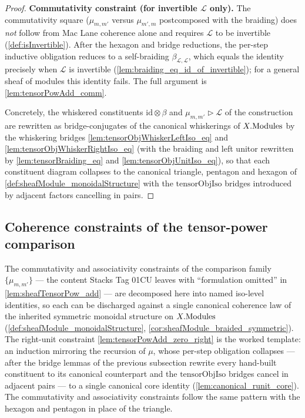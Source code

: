 \begin{proof}
  \textbf{Commutativity constraint (for invertible \(\mathcal{L}\) only).} The
  commutativity square (\(\mu_{m,m'}\) versus \(\mu_{m',m}\) postcomposed with the
  braiding) does \emph{not} follow from Mac Lane coherence alone and requires
  \(\mathcal{L}\) to be invertible (\cref{def:isInvertible}). After the hexagon and
  bridge reductions, the per-step inductive obligation reduces to a self-braiding
  \(\beta_{\mathcal{L},\mathcal{L}}\), which equals the identity precisely when
  \(\mathcal{L}\) is invertible (\cref{lem:braiding_eq_id_of_invertible}); for a
  general sheaf of modules this identity fails. The full argument is
  \cref{lem:tensorPowAdd_comm}.

  Concretely, the whiskered constituents \(\mathrm{id} \otimes \beta\) and
  \(\mu_{m,m'} \rhd \mathcal{L}\) of the construction are rewritten as
  bridge-conjugates of the canonical whiskerings of \(X.\mathrm{Modules}\) by the
  whiskering bridges \cref{lem:tensorObjWhiskerLeftIso_eq} and
  \cref{lem:tensorObjWhiskerRightIso_eq} (with the braiding and left unitor
  rewritten by \cref{lem:tensorBraiding_eq} and \cref{lem:tensorObjUnitIso_eq}), so
  that each constituent diagram collapses to the canonical triangle, pentagon and
  hexagon of \cref{def:sheafModule_monoidalStructure} with the
  \(\mathrm{tensorObjIso}\) bridges introduced by adjacent factors cancelling in
  pairs.
\end{proof}

\subsection{Coherence constraints of the tensor-power comparison}
\label{subsec:sgr_tensorPowAdd_constraints}

The commutativity and associativity constraints of the comparison family
\(\{\mu_{m,m'}\}\) --- the content Stacks Tag 01CU leaves with ``formulation
omitted'' in \cref{lem:sheafTensorPow_add} --- are decomposed here into named
iso-level identities, so each can be discharged against a single canonical
coherence law of the inherited symmetric monoidal structure on \(X.\mathrm{Modules}\)
(\cref{def:sheafModule_monoidalStructure},
\cref{cor:sheafModule_braided_symmetric}). The right-unit constraint
\cref{lem:tensorPowAdd_zero_right} is the worked template: an induction mirroring
the recursion of \(\mu\), whose per-step obligation collapses --- after the bridge
lemmas of the previous subsection rewrite every hand-built constituent to its
canonical counterpart and the \(\mathrm{tensorObjIso}\) bridges cancel in adjacent
pairs --- to a single canonical core identity
(\cref{lem:canonical_runit_core}). The commutativity and associativity constraints
follow the same pattern with the hexagon and pentagon in place of the triangle.

